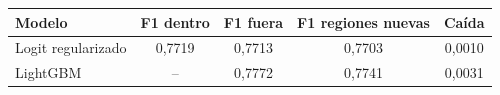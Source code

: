 \begin{tabular}{lcccc}
\toprule
\textbf{Modelo} & \textbf{F1 dentro} & \textbf{F1 fuera} & \textbf{F1 regiones nuevas} & \textbf{Caída} \\
\midrule
Logit regularizado & 0,7719 & 0,7713 & 0,7703 & 0,0010 \\
LightGBM & -- & 0,7772 & 0,7741 & 0,0031 \\
\bottomrule
\end{tabular}
